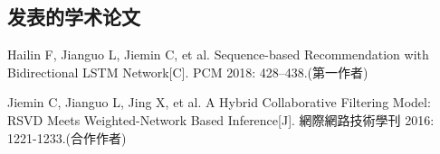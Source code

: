 ﻿\begin{resume}

  \section*{发表的学术论文} %

  \begin{enumerate}[{[}1{]}]
  \addtolength{\itemsep}{-.36\baselineskip}%
  \item Hailin F, Jianguo L, Jiemin C, et al. Sequence-based Recommendation with Bidirectional LSTM Network[C]. PCM 2018: 428--438.(第一作者)
  \item Jiemin C, Jianguo L, Jing X, et al. A Hybrid Collaborative Filtering Model: RSVD Meets Weighted-Network Based Inference[J]. 網際網路技術學刊 2016: 1221-1233.(合作作者)  
  \end{enumerate}

 
\end{resume}
